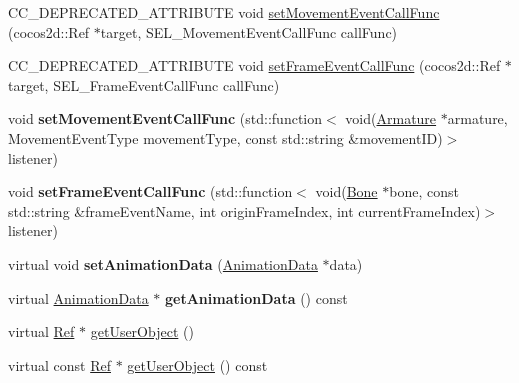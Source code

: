 \begin{DoxyCompactItemize}
\item 
C\+C\+\_\+\+D\+E\+P\+R\+E\+C\+A\+T\+E\+D\+\_\+\+A\+T\+T\+R\+I\+B\+U\+TE void \hyperlink{classcocostudio_1_1ArmatureAnimation_a0289c29d3df8b35258cabc4d2f1ad7da}{set\+Movement\+Event\+Call\+Func} (cocos2d\+::\+Ref $\ast$target, S\+E\+L\+\_\+\+Movement\+Event\+Call\+Func call\+Func)
\item 
C\+C\+\_\+\+D\+E\+P\+R\+E\+C\+A\+T\+E\+D\+\_\+\+A\+T\+T\+R\+I\+B\+U\+TE void \hyperlink{classcocostudio_1_1ArmatureAnimation_a5dd6446c9e00011e55b852d060c280f5}{set\+Frame\+Event\+Call\+Func} (cocos2d\+::\+Ref $\ast$target, S\+E\+L\+\_\+\+Frame\+Event\+Call\+Func call\+Func)
\item 
\mbox{\label{classcocostudio_1_1ArmatureAnimation_ae6d7150507e035e4b186c85cad6b5ded}} 
void {\bfseries set\+Movement\+Event\+Call\+Func} (std\+::function$<$ void(\hyperlink{classcocostudio_1_1Armature}{Armature} $\ast$armature, Movement\+Event\+Type movement\+Type, const std\+::string \&movement\+ID)$>$ listener)
\item 
\mbox{\label{classcocostudio_1_1ArmatureAnimation_a4951994d728c836fd91be4d5f5febc7e}} 
void {\bfseries set\+Frame\+Event\+Call\+Func} (std\+::function$<$ void(\hyperlink{classcocostudio_1_1Bone}{Bone} $\ast$bone, const std\+::string \&frame\+Event\+Name, int origin\+Frame\+Index, int current\+Frame\+Index)$>$ listener)
\item 
\mbox{\label{classcocostudio_1_1ArmatureAnimation_a7b55c27d62201984c6fe6b4cee285705}} 
virtual void {\bfseries set\+Animation\+Data} (\hyperlink{classcocostudio_1_1AnimationData}{Animation\+Data} $\ast$data)
\item 
\mbox{\label{classcocostudio_1_1ArmatureAnimation_a0473f0b6a8b44e12a2f137eb7f35cbff}} 
virtual \hyperlink{classcocostudio_1_1AnimationData}{Animation\+Data} $\ast$ {\bfseries get\+Animation\+Data} () const
\item 
virtual \hyperlink{classRef}{Ref} $\ast$ \hyperlink{classcocostudio_1_1ArmatureAnimation_a6fa92be3b8b72d379d70ef642328507c}{get\+User\+Object} ()
\item 
virtual const \hyperlink{classRef}{Ref} $\ast$ \hyperlink{classcocostudio_1_1ArmatureAnimation_a8ac8a61a26989e520fb828af003ff0c1}{get\+User\+Object} () const

\end{DoxyCompactItemize}
